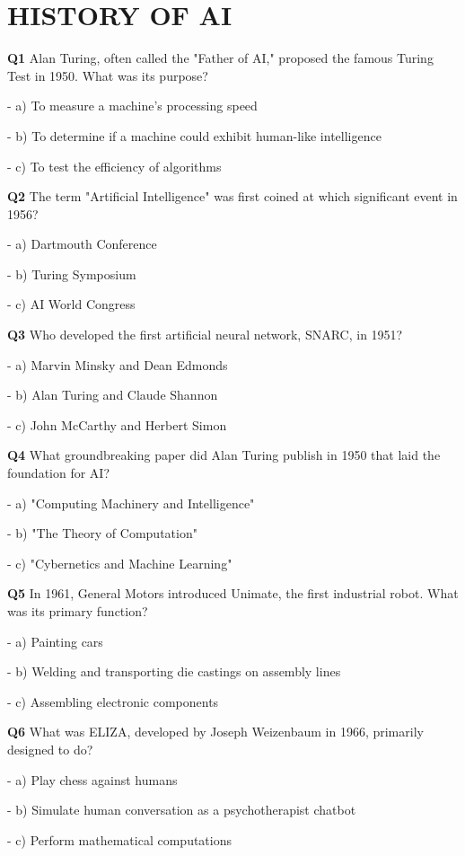 \section{HISTORY OF AI}

\textbf{Q1} Alan Turing, often called the "Father of AI," proposed the famous Turing Test in 1950. What was its purpose?\par
\quad - a) To measure a machine's processing speed\par
\quad - b) To determine if a machine could exhibit human-like intelligence\par
\quad - c) To test the efficiency of algorithms\par

\textbf{Q2} The term "Artificial Intelligence" was first coined at which significant event in 1956?\par
\quad - a) Dartmouth Conference\par
\quad - b) Turing Symposium\par
\quad - c) AI World Congress\par

\textbf{Q3} Who developed the first artificial neural network, SNARC, in 1951?\par
\quad - a) Marvin Minsky and Dean Edmonds\par
\quad - b) Alan Turing and Claude Shannon\par
\quad - c) John McCarthy and Herbert Simon\par

\textbf{Q4} What groundbreaking paper did Alan Turing publish in 1950 that laid the foundation for AI?\par
\quad - a) "Computing Machinery and Intelligence"\par
\quad - b) "The Theory of Computation"\par
\quad - c) "Cybernetics and Machine Learning"\par

\textbf{Q5} In 1961, General Motors introduced Unimate, the first industrial robot. What was its primary function?\par
\quad - a) Painting cars\par
\quad - b) Welding and transporting die castings on assembly lines\par
\quad - c) Assembling electronic components\par

\textbf{Q6} What was ELIZA, developed by Joseph Weizenbaum in 1966, primarily designed to do?\par
\quad - a) Play chess against humans\par
\quad - b) Simulate human conversation as a psychotherapist chatbot\par
\quad - c) Perform mathematical computations\par

